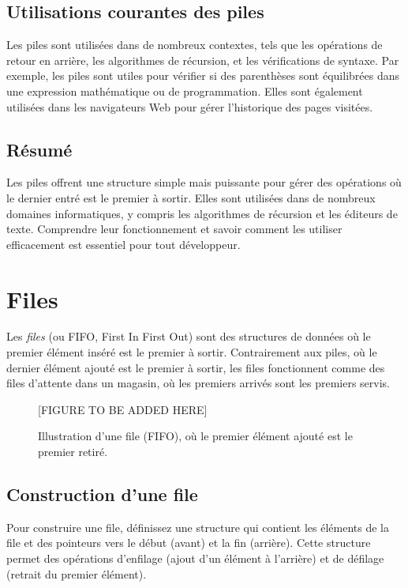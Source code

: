 \subsection{Utilisations courantes des piles}
Les piles sont utilisées dans de nombreux contextes, tels que les opérations de retour en arrière, les algorithmes de récursion, et les vérifications de syntaxe. Par exemple, les piles sont utiles pour vérifier si des parenthèses sont équilibrées dans une expression mathématique ou de programmation. Elles sont également utilisées dans les navigateurs Web pour gérer l'historique des pages visitées.

\subsection{Résumé}
Les piles offrent une structure simple mais puissante pour gérer des opérations où le dernier entré est le premier à sortir. Elles sont utilisées dans de nombreux domaines informatiques, y compris les algorithmes de récursion et les éditeurs de texte. Comprendre leur fonctionnement et savoir comment les utiliser efficacement est essentiel pour tout développeur.


\section{Files}

Les \emph{files} (ou FIFO, First In First Out) sont des structures de données où le premier élément inséré est le premier à sortir. Contrairement aux piles, où le dernier élément ajouté est le premier à sortir, les files fonctionnent comme des files d'attente dans un magasin, où les premiers arrivés sont les premiers servis.

\begin{figure}[H]
	\centering
	[FIGURE TO BE ADDED HERE]
	\caption{Illustration d'une file (FIFO), où le premier élément ajouté est le premier retiré.}
\end{figure}

\subsection{Construction d'une file}
Pour construire une file, définissez une structure qui contient les éléments de la file et des pointeurs vers le début (avant) et la fin (arrière). Cette structure permet des opérations d'enfilage (ajout d'un élément à l'arrière) et de défilage (retrait du premier élément).

